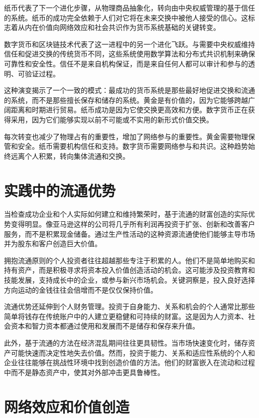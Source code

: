 \documentclass[
  Letterpaper,
]{scrbook}
\begin{document}
纸币代表了下一个进化步骤，从物理商品抽象化，转向由中央权威管理的基于信任的系统。纸币的成功完全依赖于人们对它将在未来交换中被他人接受的信心。这标志着从内在价值向网络效应和社会共识作为货币系统基础的关键转变。

数字货币和区块链技术代表了这一进程中的另一个进化飞跃。与需要中央权威维持信任和促进交换的传统货币不同，这些系统使用数学算法和分布式共识机制来确保可靠性和安全性。信任不是来自机构保证，而是来自任何人都可以审计和参与的透明、可验证过程。

这种演变揭示了一个一致的模式：最成功的货币系统是那些最好地促进交换和流通的系统，而不是那些擅长保存和储存的系统。黄金是有价值的，因为它能够跨越广阔距离和时期进行贸易。纸币成功是因为它使交换更高效和方便。数字货币正在获得采用，因为它们能够实现以前不可能或不实用的新形式价值交换。

每次转变也减少了物理占有的重要性，增加了网络参与的重要性。黄金需要物理保管和安全。纸币需要机构信任和支持。数字货币需要网络参与和共识。这种趋势始终远离个人积累，转向集体流通和交换。

\section{实践中的流通优势}\label{ux5b9eux8df5ux4e2dux7684ux6d41ux901aux4f18ux52bf}

当检查成功企业和个人实际如何建立和维持繁荣时，基于流通的财富创造的实际优势变得明显。像亚马逊这样的公司将几乎所有利润再投资于扩张、创新和改善客户服务，而不是积累现金储备。通过生产性活动的这种资源流通使他们能够主导市场并为股东和客户创造巨大价值。

拥抱流通原则的个人投资者往往超越那些专注于积累的人。他们不是简单地购买和持有资产，而是积极寻求将资本投入价值创造活动的机会。这可能涉及投资教育和技能发展，支持成长中的企业，或参与新兴市场机会。关键洞察是，投入良好选择方向运动的金钱往往会倍增而不是仅仅保持价值。

流通优势还延伸到个人财务管理。投资于自身能力、关系和机会的个人通常比那些简单将钱存在传统账户中的人建立更稳健和可持续的财富。这是因为人力资本、社会资本和智力资本都通过使用和发展而不是储存和保存来升值。

此外，基于流通的方法在经济混乱期间往往更具韧性。当市场快速变化时，储存资产可能快速而决定性地失去价值。然而，投资于能力、关系和适应性系统的个人和企业往往能够在挑战性环境中找到创造价值的方法。他们的财富嵌入在流动和过程中而不是静态资产中，使其对外部冲击更具鲁棒性。

\section{网络效应和价值创造}\label{ux7f51ux7edcux6548ux5e94ux548cux4ef7ux503cux521bux9020}
\end{document}
